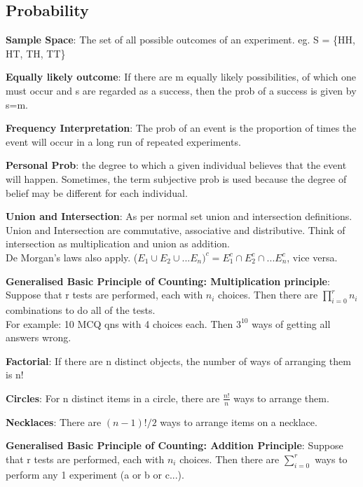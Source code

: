 \documentclass[a4paper,landscape]{article}
\newcommand{\rntopic}[1]{\vspace{-2.0em}\subsection*{#1}\vspace{-1.0em}}
\newcommand{\rnname}[1]{\textbf{#1}}
\begin{document}
\footnotesize
{}
\vspace*{-\baselineskip}\leavevmode
\vspace{-1.2cm}

\begin{multicols*}{4}

\raggedright

\rntopic{Probability}
\vspace{0.3cm}
\begin{flatitemize}
\item \rnname{Sample Space}: The set of all possible outcomes of an experiment. eg. S = \{HH, HT, TH, TT\}
\item \rnname{Equally likely outcome}: If there are m equally likely possibilities, of which one must occur and s are regarded as a success, then the prob of a success is given by s=m.
\item \rnname{Frequency Interpretation}: The prob of an event is the proportion of times the event will occur in a
long run of repeated experiments.
\item \rnname{Personal Prob}: the degree to which a given individual believes that the event will happen. Sometimes, the term subjective prob is used because the degree of belief may be different for each
individual.
\item \rnname{Union and Intersection}: As per normal set union and intersection definitions. \\ Union and Intersection are commutative, associative and distributive. Think of intersection as multiplication and union as addition. \\
De Morgan's laws also apply. ($E_1 \cup E_2 \cup ...E_n)^c = E_1^c \cap E_2^c \cap ... E_n^c$, vice versa.
\item \rnname{Generalised Basic Principle of Counting: Multiplication principle}: Suppose that r tests are performed, each with $n_i$ choices. Then there are $\prod_{i=0}^r n_i$ combinations to do all of the tests. \\
For example: 10 MCQ qns with 4 choices each. Then $3^{10}$ ways of getting all answers wrong.
\item \rnname{Factorial}: If there are n distinct objects, the number of ways of arranging them is n!
\item \rnname{Circles}: For n distinct items in a circle, there are $\frac{n!}{n}$ ways to arrange them.
\item \rnname{Necklaces}: There are $(n-1)!/2$ ways to arrange items on a necklace.
\item \rnname{Generalised Basic Principle of Counting: Addition Principle}: Suppose that r tests are performed, each with $n_i$ choices. Then there are $\sum_{i=0}^{r}$ ways to perform any 1 experiment (a or b or c...).

\end{flatitemize}
\end{multicols*}
\end{document}
